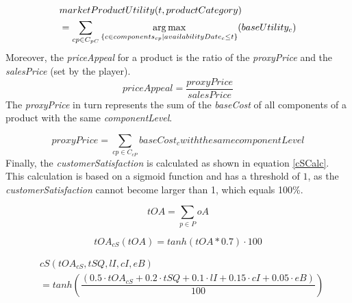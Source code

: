\begin{equation}
\label{marketProdUtility}
\begin{aligned}
    & marketProductUtility(t, productCategory) \\
    & = \sum_{cp \in C_{pC}} \operatorname*{arg\,max}\limits_{\{c \in components_{cp}| availabilityDate_c \leq t\}}(baseUtility_c)
\end{aligned}    
\end{equation}
Moreover, the \textit{priceAppeal} for a product is the ratio of the \textit{proxyPrice} and the \textit{salesPrice} (set by the player).
\begin{equation}
    priceAppeal = \dfrac{proxyPrice}{salesPrice}
\end{equation}
The \textit{proxyPrice} in turn represents the sum of the \textit{baseCost} of all components of a product with the same \textit{componentLevel}.

\begin{equation}
    proxyPrice = \sum_{cp \in C_{cP}} baseCost_{c} with the same componentLevel
\end{equation}
Finally, the \textit{customerSatisfaction} is calculated as shown in equation \ref{cSCalc}. This calculation is based on a sigmoid function and has a threshold of $1$, as the \textit{customerSatisfaction} cannot become larger than 1, which equals 100\%.

\begin{equation}
    tOA = \sum_{p \in P} oA
\end{equation}

\begin{equation}
   tOA_{cS}(tOA) = tanh(tOA * 0.7) \cdot 100
\end{equation}

\begin{equation}
\begin{aligned}
\label{cSCalc}
    & cS(tOA_{cS}, tSQ, lI, cI, eB) \\
    & = tanh(\dfrac{(0.5 \cdot tOA_{cS} + 0.2 \cdot tSQ + 0.1 \cdot lI + 0.15 \cdot cI + 0.05 \cdot eB)}{100}) %
\end{aligned}   
\end{equation}

